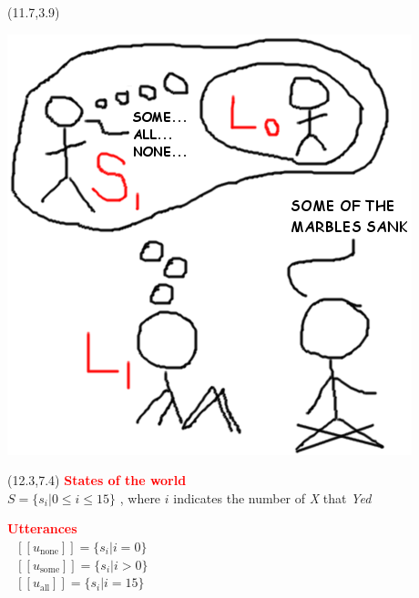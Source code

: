 \documentclass[a0,portrait]{a0poster}
\newcommand{\denote}[1]{\mbox{ $[\![ #1 ]\!]$}}
\newcommand{\red}[1]{\textcolor{Red}{#1}}
\newcommand{\gray}[1]{\textcolor{MyGray}{#1}}
\begin{document}
\begin{textblock}{7}
\begin{textblock}{7.5}
\begin{textblock}{3}(11.7,3.9)

\includegraphics[scale=.8]{pics/recursivereasoning.png}
  
\end{textblock} 

\begin{textblock}{2.5}(12.3,7.4)
\red{\textbf{States of the world}}\\
$S = \{s_i | 0 \leq i \leq 15\}$%
, where $i$ indicates the number of \emph{X} that \emph{Yed}

\red{\textbf{Utterances}}\\
$\denote{u_{\textrm{none}}}= \{s_i | i = 0\}$\\  
$\denote{u_{\textrm{some}}}= \{s_i | i > 0\}$\\
$\denote{u_{\textrm{all}}}= \{s_i | i = 15\}$
  
\end{textblock} 

  

\end{textblock}
\end{textblock}
\end{document}
